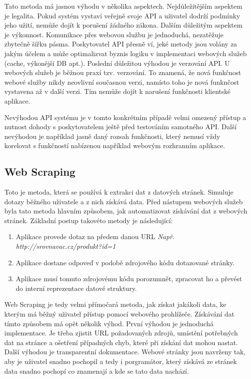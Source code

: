 Tato metoda má jasnou výhodu v několika aspektech. Nejdůležitějším aspektem je legalita. Pokud systém vystaví veřejně svoje API a uživatel dodrží podmínky jeho užití, nemůže dojít k porušení žádného zákona. Dalším důležitým aspektem je výkonnost. Komunikace přes webovou službu je jednoduchá, nezatěžuje zbytečně šířku pásma. Poskytovatel API přesně ví, jeké metody jsou volány za jakým účelem a může optimalizvat byznis logiku v implementaci webových služeb (cache, výkonější DB apt.). Poslední důležitou výhodou je verzování API. U webových služeb je běžnou praxí tzv. verzování\cite{josuttis2007soa}. To znamená, že nová funkčnost webové služby nikdy neovlivní současnou verzi, namísto toho je nová funknčost vystavena až v další verzi. Tím nemůže dojít k narušení funkčnosti klientské aplikace.

Nevýhodou API systému je v tomto konkrétním případě velmi omezený přístup a nutnost dohody s poskytovatelem ještě před testováním samotného API. Další nevýhodou je například jasně daný rozsah funkčnosti, který nemusí vždy korelovat s funkčností nabízenou například webovým rozhranním aplikace.

\subsection{Web Scraping}
\label{sec:screenscraping}
Toto je metoda, která se používá k extrakci dat z datových stránek. Simuluje dotazy běžného uživatele a z nich získává data. Před nástupem webových služeb byla tato metoda hlavním způsobem, jak automatizovat získávání dat z webových stránek\cite{oreilly2007web}. Základní postup takovéto metody je následující:

\begin{enumerate}
\item Aplikace provede dotaz na předem danou URL \emph{Např. http://srovnavac.cz/produkt?id=1}
\item Aplikace dostane odpoveď v podobě zdrojového kódu dotazované stránky.
\item Aplikace musí tomuto zdrojovému kódu porozumnět, zpracovat ho a převést do interní reprezentace datové struktury.
\end{enumerate}

Web Scraping je tedy velmi přímočará metoda, jak získat jakákoli data, ke kterým má běžný uživatel přístup pomocí webového prohlížeče. Získávání dat tímto způsobem má opět několik výhod. První výhodou je jednoduchá implementace. Je třeba zjistit URL požadovaných zdrojů, umístění potřebných dat na stránce a ošetření případných chyb, které při získání dat mohou nastat. Další výhodou je transparentní dokumentace. Webové stránky jsou navrženy tak, aby je uživatel snadno pochopil a tedy i porgramátor, který získává ze stránek data snadno pochopí co znamenají a kde se tato data nachází.


